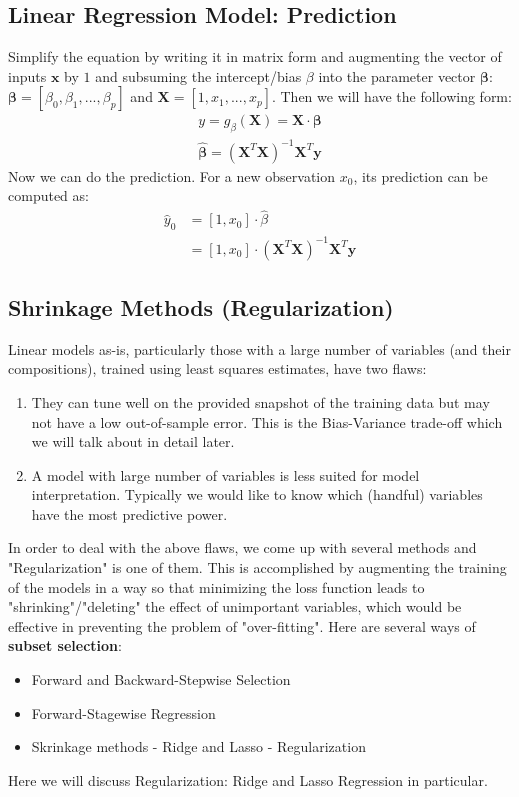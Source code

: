 \documentclass{article}
\begin{document}
\subsection{Linear Regression Model: Prediction}
Simplify the equation by writing it in matrix form and augmenting the vector of inputs $\bm{x}$ by $1$ and subsuming the intercept/bias $\beta$ into the parameter vector $\bm{\beta}$: $\bm{\beta} = [\beta_{0}, \beta_{1}, ..., \beta_{p}]$ and $\bm{X} = [1, x_{1}, ..., x_{p}]$. Then we will have the following form:
\begin{align*}
    y = g_{\beta}(\bm{X}) = \bm{X} \cdot \bm{\beta}\\
    \hat{\bm{\beta}} = (\bm{X}^{T} \bm{X})^{-1}\bm{X}^{T}\bm{y}
\end{align*}
Now we can do the prediction. For a new observation $x_{0}$, its prediction can be computed as:
\begin{align*}
    \hat{y}_{0} &= [1,x_{0}] \cdot \hat{\beta}\\
    &= [1,x_{0}] \cdot (\bm{X}^{T} \bm{X})^{-1}\bm{X}^{T}\bm{y}
\end{align*}

\subsection{Shrinkage Methods (Regularization)}

Linear models as-is, particularly those with a large number of variables (and their compositions), trained using least squares estimates, have two flaws:
\begin{enumerate}
    \item They can tune well on the provided snapshot of the training data but may not have a low out-of-sample error. This is the Bias-Variance trade-off which we will talk about in detail later.
    \item A model with large number of variables is less suited for model interpretation. Typically we would like to know which (handful) variables have the most predictive power.
\end{enumerate}
In order to deal with the above flaws, we come up with several methods and "Regularization" is one of them. This is accomplished by augmenting the training of the models in a way so that minimizing the loss function leads to "shrinking"/"deleting" the effect of unimportant variables, which would be effective in preventing the problem of "over-fitting". Here are several ways of \textbf{subset selection}:
\begin{itemize}
    \item Forward and Backward-Stepwise Selection
    \item Forward-Stagewise Regression
    \item Skrinkage methods - Ridge and Lasso - Regularization
\end{itemize}
Here we will discuss Regularization: Ridge and Lasso Regression in particular.
\end{document}
